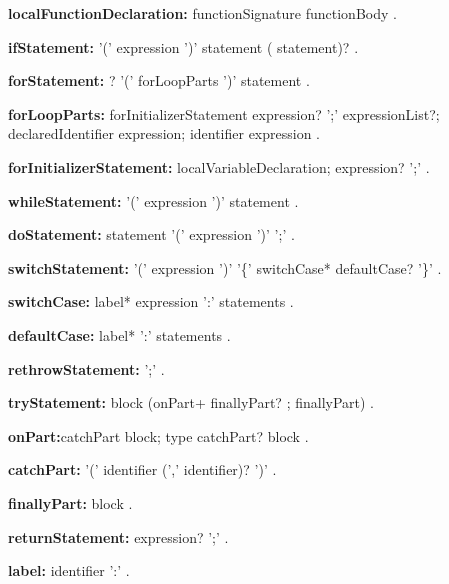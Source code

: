 \begin{grammar}
{\bf localFunctionDeclaration:}
    functionSignature functionBody
    .
\end{grammar}
\begin{grammar}
{\bf ifStatement:}
    \IF{} '(' expression ')' statement ( \ELSE{} statement)?
    .
\end{grammar}
\begin{grammar}
{\bf forStatement:}
    \AWAIT? \FOR{} '(' forLoopParts ')' statement
    .

{\bf forLoopParts:}
    forInitializerStatement expression? ';' expressionList?;
    declaredIdentifier \IN{} expression;
    identifier \IN{} expression
    .

{\bf forInitializerStatement:}
    localVariableDeclaration;
    expression? ';'
    .
\end{grammar}
\begin{grammar}
{\bf whileStatement:}
    \WHILE{} '(' expression ')' statement
    .
\end{grammar}
\begin{grammar}
{\bf doStatement:}
    \DO{} statement \WHILE{} '(' expression ')' ';'
    .
\end{grammar}
\begin{grammar}
{\bf switchStatement:}
    \SWITCH{} '(' expression ')' '\{' switchCase* defaultCase? '\}'
    .

{\bf switchCase:}
    label* \CASE{} expression ':' statements
    .

{\bf defaultCase:}
    label* \DEFAULT{} ':' statements
    .
\end{grammar}
\begin{grammar}
{\bf rethrowStatement:}
    \RETHROW{}  ';'
    .
\end{grammar}
\begin{grammar}
{\bf tryStatement:}
    \TRY{} block (onPart+ finallyPart? ; finallyPart)
    .

{\bf onPart:}catchPart block;
    \ON{} type catchPart? block
    .

{\bf catchPart:}
    \CATCH{} '(' identifier (',' identifier)? ')' 
    .

{\bf finallyPart:}
    \FINALLY{} block
    .
\end{grammar}
\begin{grammar}
{\bf returnStatement:}
    \RETURN{} expression? ';'
    .
\end{grammar}
\begin{grammar}
{\bf label:}
    identifier ':'
    .
\end{grammar}
